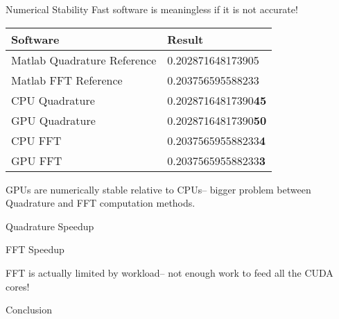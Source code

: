 \documentclass{beamer}
\begin{document}
\begin{frame}[t]{Numerical Stability}
Fast software is meaningless if it is not accurate!

\begin{table}
\centering
\begin{tabular}{|l|l|}
\hline
\bfseries Software & \bfseries Result \\
\hline\hline
Matlab Quadrature Reference  & 0.202871648173905 \\
Matlab FFT Reference         & 0.203756595588233 \\
\hline
\hline
CPU Quadrature     & 0.20287164817390\textbf{45} \\
GPU Quadrature     & 0.20287164817390\textbf{50} \\
\hline
\hline
CPU FFT            & 0.203756595588233\textbf{4} \\
GPU FFT            & 0.203756595588233\textbf{3} \\
\hline
\end{tabular}
\end{table}
\vfill
GPUs are numerically stable relative to CPUs-- bigger problem between Quadrature and FFT computation methods.
\end{frame}

\begin{frame}[t]{Quadrature Speedup}

\end{frame}

\begin{frame}[t]{FFT Speedup}

FFT is actually limited by workload-- not enough work to feed all the CUDA cores!
\end{frame}

\begin{frame}[t]{Conclusion}

\end{frame}
\end{document}
